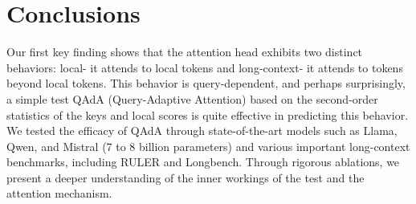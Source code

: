 \section{Conclusions }
Our first key finding shows that the attention head exhibits two distinct behaviors: local- it attends to local tokens and long-context- it attends to tokens beyond local tokens. This behavior is query-dependent, and perhaps surprisingly, a simple test QAdA (Query-Adaptive Attention) based on the second-order statistics of the keys and local scores is quite effective in predicting this behavior. We tested the efficacy of QAdA through state-of-the-art models such as Llama, Qwen, and Mistral (7 to 8 billion parameters) and various important long-context benchmarks, including RULER and Longbench. Through rigorous ablations, we present a deeper understanding of the inner workings of the test and the attention mechanism.














